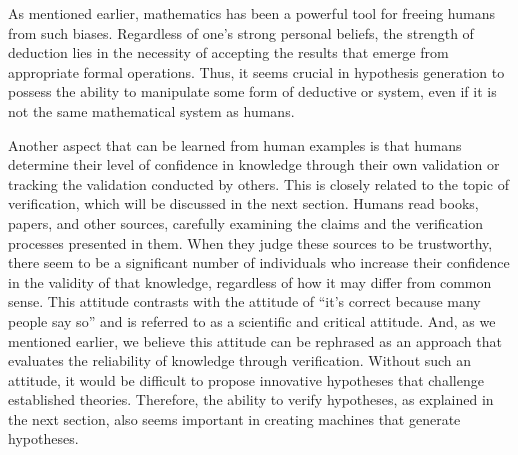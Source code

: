 \documentclass{book}
\begin{document}

As mentioned earlier, mathematics has been a powerful tool for freeing humans from such biases. Regardless of one's strong personal beliefs, the strength of deduction lies in the necessity of accepting the results that emerge from appropriate formal operations. Thus, it seems crucial in hypothesis generation to possess the ability to manipulate some form of deductive or system, even if it is not the same mathematical system as humans.

Another aspect that can be learned from human examples is that humans determine their level of confidence in knowledge through their own validation or tracking the validation conducted by others. This is closely related to the topic of verification, which will be discussed in the next section. Humans read books, papers, and other sources, carefully examining the claims and the verification processes presented in them. When they judge these sources to be trustworthy, there seem to be a significant number of individuals who increase their confidence in the validity of that knowledge, regardless of how it may differ from common sense. This attitude contrasts with the attitude of ``it's correct because many people say so'' and is referred to as a scientific and critical attitude. And, as we mentioned earlier, we believe this attitude can be rephrased as an approach that evaluates the reliability of knowledge through verification. Without such an attitude, it would be difficult to propose innovative hypotheses that challenge established theories. Therefore, the ability to verify hypotheses, as explained in the next section, also seems important in creating machines that generate hypotheses.

\end{document}
